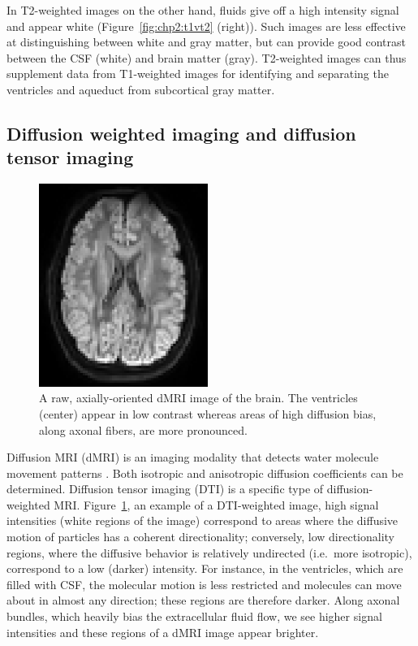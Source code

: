 %
%
In T2-weighted images on the other hand, fluids give off a high
intensity signal and appear white (Figure~\ref{fig:chp2:t1vt2}
(right)). Such images are less effective at distinguishing between
white and gray matter, but can provide good contrast between the CSF
(white) and brain matter (gray). T2-weighted images can thus
supplement data from T1-weighted images for identifying and separating
the ventricles and aqueduct from subcortical gray matter.

\subsection{Diffusion weighted imaging and diffusion tensor imaging}

\begin{figure}
  \sidecaption
  \centering
  \includegraphics[width=0.49\textwidth]{./graphics/chp2/DTI-slice-image-crop.png}
  \caption{A raw, axially-oriented dMRI image of the brain. The ventricles (center) 
appear in low contrast whereas areas of high diffusion bias, along axonal fibers, 
are more pronounced.}
  \label{fig:chp2:dti}
\end{figure}

%
%
Diffusion MRI (dMRI) is an imaging modality that detects water
molecule movement patterns \cite{jeurissen2017,soares2013hitchhiker}.
Both isotropic and anisotropic diffusion coefficients can be
determined.  Diffusion tensor imaging (DTI) is a specific type of 
diffusion-weighted MRI. Figure~\ref{fig:chp2:dti}, an example of a DTI-weighted
image, high signal intensities (white regions of the image) correspond
to areas where the diffusive motion of particles has a coherent
directionality; conversely, low directionality regions, where the
diffusive behavior is relatively undirected (i.e.~more isotropic),
correspond to a low (darker) intensity. For instance, in the
ventricles, which are filled with CSF, the molecular
motion is less restricted and molecules can move about in almost any
direction; these regions are therefore darker.  Along axonal
bundles, which heavily bias the extracellular fluid flow, we see
higher signal intensities and these regions of a dMRI image appear
brighter.

